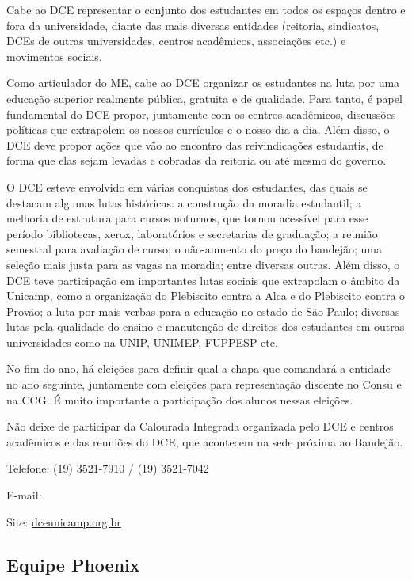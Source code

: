 Cabe ao DCE representar o conjunto dos estudantes em todos os espaços dentro e
fora da universidade, diante das mais diversas entidades (reitoria, sindicatos,
DCEs de outras universidades, centros acadêmicos, associações etc.) e movimentos
sociais.

Como articulador do ME, cabe ao DCE organizar os estudantes na luta por uma
educação superior realmente pública, gratuita e de qualidade. Para tanto, é
papel fundamental do DCE propor, juntamente com os centros acadêmicos,
discussões políticas que extrapolem os nossos currículos e o nosso dia a dia.
Além disso, o DCE deve propor ações que vão ao encontro das reivindicações
estudantis, de forma que elas sejam levadas e cobradas da reitoria ou até mesmo
do governo.

O DCE esteve envolvido em várias conquistas dos estudantes, das quais se
destacam algumas lutas históricas: a construção da moradia estudantil; a
melhoria de estrutura para cursos noturnos, que tornou acessível para esse
período bibliotecas, xerox, laboratórios e secretarias de graduação; a reunião
semestral para avaliação de curso; o não-aumento do preço do bandejão; uma
seleção mais justa para as vagas na moradia; entre diversas outras. Além disso,
o DCE teve participação em importantes lutas sociais que extrapolam o âmbito da
Unicamp, como a organização do Plebiscito contra a Alca e do Plebiscito contra o
Provão; a luta por mais verbas para a educação no estado de São Paulo; diversas
lutas pela qualidade do ensino e manutenção de direitos dos estudantes em outras
universidades como na UNIP, UNIMEP, FUPPESP etc.

No fim do ano, há eleições para definir qual a chapa que comandará a entidade no
ano seguinte, juntamente com eleições para representação discente no Consu e na
CCG. É muito importante a participação dos alunos nessas eleições.

Não deixe de participar da Calourada Integrada organizada pelo DCE e centros
acadêmicos e das reuniões do DCE, que acontecem na sede próxima ao Bandejão.

\begin{compactitemize}
    \item  Telefone: (19) 3521-7910 / (19) 3521-7042
    \item  E-mail: 
    \item  Site: \url{dceunicamp.org.br}
\end{compactitemize}

\subsection{Equipe Phoenix}

